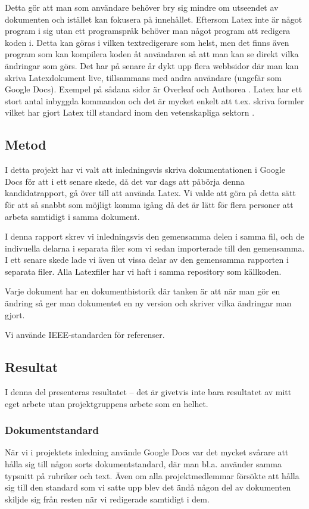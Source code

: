 Detta gör att man som användare behöver bry sig mindre om utseendet av dokumenten och istället kan fokusera på innehållet. Eftersom Latex inte är något program i sig utan ett programspråk behöver man något program att redigera koden i. Detta kan göras i vilken textredigerare som helst, men det finns även program som kan kompilera koden åt användaren så att man kan se direkt vilka ändringar som görs. Det har på senare år dykt upp flera webbsidor där man kan skriva Latexdokument live, tillsammans med andra användare (ungefär som Google Docs). Exempel på sådana sidor är Overleaf \cite{overleaf} och Authorea \cite{authorea}. Latex har ett stort antal inbyggda kommandon och det är mycket enkelt att t.ex. skriva formler vilket har gjort Latex till standard inom den vetenskapliga sektorn \cite{latex_standard}.

\subsection{Metod}
I detta projekt har vi valt att inledningsvis skriva dokumentationen i Google Docs för att i ett senare skede, då det var dags att påbörja denna kandidatrapport, gå över till att använda Latex. Vi valde att göra på detta sätt för att så snabbt som möjligt komma igång då det är lätt  för flera personer att arbeta samtidigt i samma dokument.

I denna rapport skrev vi inledningsvis den gemensamma delen i samma fil, och de indivuella delarna i separata filer som vi sedan importerade till den gemensamma. I ett senare skede lade vi även ut vissa delar av den gemensamma rapporten i separata filer. Alla Latexfiler har vi haft i samma repository som källkoden.

Varje dokument har en dokumenthistorik där tanken är att när man gör en ändring så ger man dokumentet en ny version och skriver vilka ändringar man gjort.

Vi använde IEEE-standarden för referenser.

\subsection{Resultat}
I denna del presenteras resultatet -- det är givetvis inte bara resultatet av mitt eget arbete utan projektgruppens arbete som en helhet.

\subsubsection{Dokumentstandard}
När vi i projektets inledning använde Google Docs var det mycket svårare att hålla sig till någon sorts dokumentstandard, där man bl.a. använder samma typsnitt på rubriker och text. Även om alla projektmedlemmar försökte att hålla sig till den standard som vi satte upp blev det ändå någon del av dokumenten skiljde sig från resten när vi redigerade samtidigt i dem.

